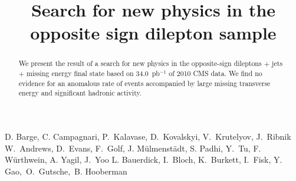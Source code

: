 \documentclass{cmspaper}
\begin{document}
  

\begin{titlepage}
    \pagestyle {plain}

  \title {Search for new physics in the opposite sign dilepton sample}
\begin{Authlist}
D. Barge, C. Campagnari, P.~Kalavase, D.~Kovalskyi, V.~Krutelyov, J.~Ribnik
W.~Andrews, D.~Evans, F.~Golf, J. M\"ulmenst\"adt, S. Padhi, Y.~Tu, F. W\"urthwein, A. Yagil, J.~Yoo
L. Bauerdick, I.~Bloch, K.~Burkett, I.~Fisk, Y.~ Gao,~O.~Gutsche,~B. Hooberman
\end{Authlist}
 

    \begin{abstract}
We present the result of a search for new physics in the opposite-sign 
dileptons $+$ jets $+$ missing energy final state based on 34.0~pb$^{-1}$ 
of 2010 CMS data.  We find no evidence for an anomalous rate of events
accompanied by large missing transverse energy and significant hadronic
activity.

  \end{abstract}

\end{titlepage}
\newpage


\tableofcontents
\newpage
\linenumbers














\clearpage

\clearpage
\appendixtitleon
\appendixtitletocon
\begin{appendices}
   
   
   
\end{appendices}
\end{document}
